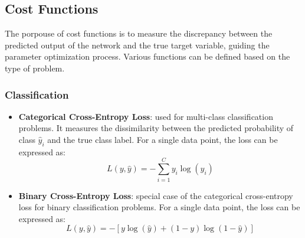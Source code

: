 \subsection{Cost Functions}
The porpouse of cost functions is to measure the discrepancy between the predicted output of the network and the true target variable, guiding the parameter optimization process.
Various functions can be defined based on the type of problem.

\subsubsection*{Classification}
\begin{itemize}
    \item \textbf{Categorical Cross-Entropy Loss}: used for multi-class classification problems. It measures the dissimilarity between the predicted
    probability of class $\hat{y}_i$ and the true class label.
    For a single data point, the loss can be expressed as:
    \begin{equation*}
        L(y, \hat{y}) = -\sum_{i=1}^{C} y_i \log(\hat{y}_i)
    \end{equation*}
    \item \textbf{Binary Cross-Entropy Loss}: special case of the categorical cross-entropy loss for binary classification problems.
    For a single data point, the loss can be expressed as:
    \begin{equation*}
        L(y, \hat{y}) = -[y \log(\hat{y}) + (1 - y) \log(1 - \hat{y})]
    \end{equation*}
\end{itemize}

